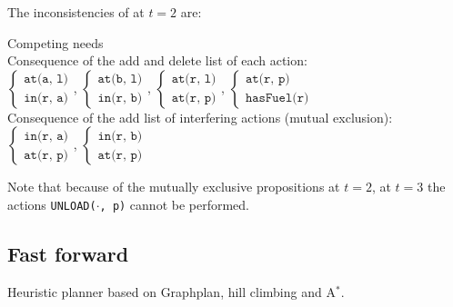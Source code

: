 \begin{example}
    The inconsistencies of at $t=2$ are:
    \begin{descriptionlist}
        \item[Competing needs] \phantom{}\\[0.5em]
            Consequence of the add and delete list of each action:\\[0.3em]
                $\begin{cases}\texttt{at(a, l)} \\ \texttt{in(r, a)}\end{cases}$,
                $\begin{cases}\texttt{at(b, l)} \\ \texttt{in(r, b)}\end{cases}$,
                $\begin{cases}\texttt{at(r, l)} \\ \texttt{at(r, p)}\end{cases}$,
                $\begin{cases}\texttt{at(r, p)} \\ \texttt{hasFuel(r)}\end{cases}$\\[0.5em]
            Consequence of the add list of interfering actions (mutual exclusion):\\[0.3em]
                $\begin{cases}\texttt{in(r, a)} \\ \texttt{at(r, p)}\end{cases}$,
                $\begin{cases}\texttt{in(r, b)} \\ \texttt{at(r, p)}\end{cases}$
    \end{descriptionlist}

    Note that because of the mutually exclusive propositions at $t=2$, 
    at $t=3$ the actions \texttt{UNLOAD($\cdot$, p)} cannot be performed.
\end{example}


\subsection{Fast forward}
Heuristic planner based on Graphplan, hill climbing and A$^*$.

